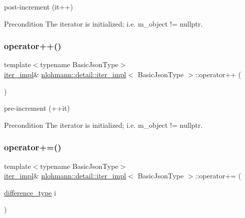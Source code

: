 post-\/increment (it++) 

\begin{DoxyPrecond}{Precondition}
The iterator is initialized; i.\+e. {\ttfamily m\+\_\+object != nullptr}. 
\end{DoxyPrecond}
\mbox{\label{classnlohmann_1_1detail_1_1iter__impl_abdfe2a7f464400a7ab572782d14b922f}} 
\subsubsection{\texorpdfstring{operator++()}{operator++()}\hspace{0.1cm}{\footnotesize\ttfamily [2/2]}}
{\footnotesize\ttfamily template$<$typename Basic\+Json\+Type$>$ \\
\mbox{\hyperlink{classnlohmann_1_1detail_1_1iter__impl}{iter\+\_\+impl}}\& \mbox{\hyperlink{classnlohmann_1_1detail_1_1iter__impl}{nlohmann\+::detail\+::iter\+\_\+impl}}$<$ Basic\+Json\+Type $>$\+::operator++ (\begin{DoxyParamCaption}{ }\end{DoxyParamCaption})\hspace{0.3cm}{\ttfamily [inline]}}



pre-\/increment (++it) 

\begin{DoxyPrecond}{Precondition}
The iterator is initialized; i.\+e. {\ttfamily m\+\_\+object != nullptr}. 
\end{DoxyPrecond}
\mbox{\label{classnlohmann_1_1detail_1_1iter__impl_a3eef94f9d167046e7f773aeb6b78090c}} 
\subsubsection{\texorpdfstring{operator+=()}{operator+=()}}
{\footnotesize\ttfamily template$<$typename Basic\+Json\+Type$>$ \\
\mbox{\hyperlink{classnlohmann_1_1detail_1_1iter__impl}{iter\+\_\+impl}}\& \mbox{\hyperlink{classnlohmann_1_1detail_1_1iter__impl}{nlohmann\+::detail\+::iter\+\_\+impl}}$<$ Basic\+Json\+Type $>$\+::operator+= (\begin{DoxyParamCaption}\item[{\mbox{\hyperlink{classnlohmann_1_1detail_1_1iter__impl_a2f7ea9f7022850809c60fc3263775840}{difference\+\_\+type}}}]{i }\end{DoxyParamCaption})\hspace{0.3cm}{\ttfamily [inline]}}



